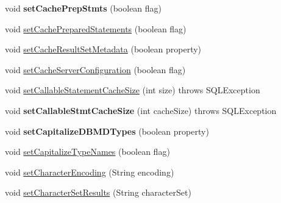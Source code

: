 \begin{DoxyCompactItemize}
\item 
\mbox{\label{classcom_1_1mysql_1_1jdbc_1_1jdbc2_1_1optional_1_1_connection_wrapper_a9d275d6d3264f5dd83fa3a17e30f02e4}} 
void {\bfseries set\+Cache\+Prep\+Stmts} (boolean flag)
\item 
void \mbox{\hyperlink{classcom_1_1mysql_1_1jdbc_1_1jdbc2_1_1optional_1_1_connection_wrapper_aa4df80c0af9ab1c8788c6d09d641d33b}{set\+Cache\+Prepared\+Statements}} (boolean flag)
\item 
void \mbox{\hyperlink{classcom_1_1mysql_1_1jdbc_1_1jdbc2_1_1optional_1_1_connection_wrapper_a549d3499e7fd8015aa2d761651d9f490}{set\+Cache\+Result\+Set\+Metadata}} (boolean property)
\item 
void \mbox{\hyperlink{classcom_1_1mysql_1_1jdbc_1_1jdbc2_1_1optional_1_1_connection_wrapper_acae485e2428a7a687985cf493daa6dc1}{set\+Cache\+Server\+Configuration}} (boolean flag)
\item 
void \mbox{\hyperlink{classcom_1_1mysql_1_1jdbc_1_1jdbc2_1_1optional_1_1_connection_wrapper_a8e6ffb0bce5a7d16da96043683ec3f18}{set\+Callable\+Statement\+Cache\+Size}} (int size)  throws S\+Q\+L\+Exception 
\item 
\mbox{\label{classcom_1_1mysql_1_1jdbc_1_1jdbc2_1_1optional_1_1_connection_wrapper_a43777116064168677e15ce4973a9ebe6}} 
void {\bfseries set\+Callable\+Stmt\+Cache\+Size} (int cache\+Size)  throws S\+Q\+L\+Exception 
\item 
\mbox{\label{classcom_1_1mysql_1_1jdbc_1_1jdbc2_1_1optional_1_1_connection_wrapper_aa45505e0fc853bbbcfeb3f6284914319}} 
void {\bfseries set\+Capitalize\+D\+B\+M\+D\+Types} (boolean property)
\item 
void \mbox{\hyperlink{classcom_1_1mysql_1_1jdbc_1_1jdbc2_1_1optional_1_1_connection_wrapper_a3f6d10819d7a5abdd49135f847c99fa4}{set\+Capitalize\+Type\+Names}} (boolean flag)
\item 
void \mbox{\hyperlink{classcom_1_1mysql_1_1jdbc_1_1jdbc2_1_1optional_1_1_connection_wrapper_a7f74453daef3b82cf585f58cb4c1e820}{set\+Character\+Encoding}} (String encoding)
\item 
void \mbox{\hyperlink{classcom_1_1mysql_1_1jdbc_1_1jdbc2_1_1optional_1_1_connection_wrapper_a34e64b74d02a705c8a2e5e9d9c3f7503}{set\+Character\+Set\+Results}} (String character\+Set)

\end{DoxyCompactItemize}
